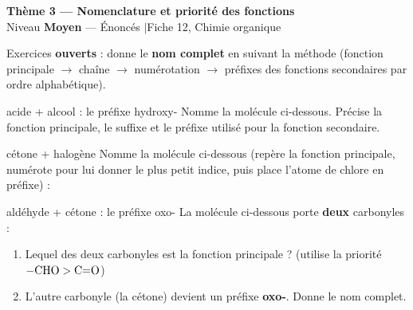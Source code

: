 \documentclass[11pt,a4paper]{article}
\newcommand{\banner}[2]{%
\begin{tcolorbox}[enhanced,colback=primary,colframe=primary,arc=5pt,boxrule=0pt,
   left=5mm,right=5mm,top=2.5mm,bottom=2.5mm,coltext=white]
{\large\bfseries #1}\\[1pt]{\small #2}
\end{tcolorbox}\vspace{2pt}}
\begin{document}
\banner{Thème 3 — Nomenclature et priorité des fonctions}{Niveau \textbf{Moyen} — Énoncés \quad$\vert$\quad Fiche 12, Chimie organique}

\begin{consigne}
Exercices \textbf{ouverts} : donne le \textbf{nom complet} en suivant la méthode (fonction principale $\to$ chaîne $\to$ numérotation $\to$ préfixes des fonctions secondaires par ordre alphabétique).
\end{consigne}

\begin{exo}{acide + alcool : le préfixe hydroxy-}
Nomme la molécule ci-dessous. Précise la fonction principale, le suffixe et le préfixe utilisé pour la fonction secondaire.
\begin{center}\end{center}
\end{exo}

\begin{exo}{cétone + halogène}
Nomme la molécule ci-dessous (repère la fonction principale, numérote pour lui donner le plus petit indice, puis place l'atome de chlore en préfixe) :
\begin{center}\end{center}
\end{exo}

\begin{exo}{aldéhyde + cétone : le préfixe oxo-}
La molécule ci-dessous porte \textbf{deux} carbonyles :
\begin{center}\end{center}
\begin{enumerate}[label=\textbf{\alph*)},leftmargin=2em,itemsep=1pt]
  \item Lequel des deux carbonyles est la fonction principale ? (utilise la priorité $\ce{-CHO} > \text{C=O}$)
  \item L'autre carbonyle (la cétone) devient un préfixe \textbf{oxo-}. Donne le nom complet.
\end{enumerate}
\end{exo}
\end{document}
